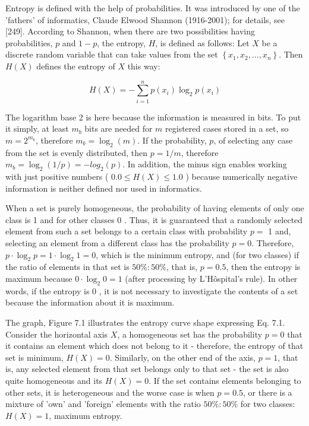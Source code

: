 Entropy is defined with the help of probabilities. It was introduced by one of the 'fathers' of informatics, Claude Elwood Shannon (1916-2001); for details, see [249]. According to Shannon, when there are two possibilities having probabilities, $p$ and $1-p$, the entropy, $H$, is defined as follows: Let $X$ be a discrete random variable that can take values from the set $\left\{x_{1}, x_{2}, \ldots, x_{n}\right\}$. Then $H(X)$ defines the entropy of $X$ this way:


\begin{equation*}
H(X)=-\sum_{i=1}^{n} p\left(x_{i}\right) \log _{2} p\left(x_{i}\right) \tag{7.1}
\end{equation*}


The logarithm base 2 is here because the information is measured in bits. To put it simply, at least $m_{b}$ bits are needed for $m$ registered cases stored in a set, so $m=2^{m_{b}}$, therefore $m_{b}=\log _{2}(m)$. If the probability, $p$, of selecting any case from the set is evenly distributed, then $p=1 / m$, therefore $m_{b}=\log _{2}(1 / p)= -l o g_{2}(p)$. In addition, the minus sign enables working with just positive numbers ( $0.0 \leq H(X) \leq 1.0$ ) because numerically negative information is neither defined nor used in informatics.

When a set is purely homogeneous, the probability of having elements of only one class is 1 and for other classes 0 . Thus, it is guaranteed that a randomly selected element from such a set belongs to a certain class with probability $p=$ 1 and, selecting an element from a different class has the probability $p=0$. Therefore, $p \cdot \log _{2} p=1 \cdot \log _{2} 1=0$, which is the minimum entropy, and (for two classes) if the ratio of elements in that set is $50 \%: 50 \%$, that is, $p=0.5$, then the entropy is maximum because $0 \cdot \log _{2} 0=1$ (after processing by L'Hôspital's rule). In other words, if the entropy is 0 , it is not necessary to investigate the contents of a set because the information about it is maximum.

The graph, Figure 7.1 illustrates the entropy curve shape expressing Eq. 7.1. Consider the horizontal axis $X$, a homogeneous set has the probability $p=0$ that it contains an element which does not belong to it - therefore, the entropy of that set is minimum, $H(X)=0$. Similarly, on the other end of the axis, $p=1$, that is, any selected element from that set belongs only to that set - the set is also quite homogeneous and its $H(X)=0$. If the set contains elements belonging to other sets, it is heterogeneous and the worse case is when $p=0.5$, or there is a mixture of 'own' and 'foreign' elements with the ratio $50 \%: 50 \%$ for two classes: $H(X)=1$, maximum entropy.

